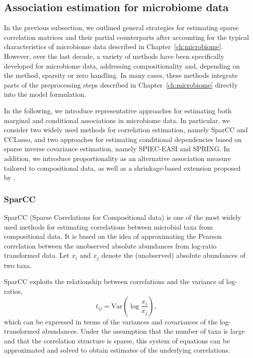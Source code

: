 \subsection{Association estimation for microbiome data}
\label{sec:5net:net_constr:asso_microbiome}

In the previous subsection, we outlined general strategies for estimating sparse correlation matrices and their partial counterparts after accounting for the typical characteristics of microbiome data described in Chapter~\ref{ch:microbiome}. However, over the last decade, a variety of methods have been specifically developed for microbiome data, addressing compositionality and, depending on the method, sparsity or zero handling. In many cases, these methods integrate parts of the preprocessing steps described in Chapter~\ref{ch:microbiome} directly into the model formulation.

In the following, we introduce representative approaches for estimating both marginal and conditional associations in microbiome data. In particular, we consider two widely used methods for correlation estimation, namely SparCC and CCLasso, and two approaches for estimating conditional dependencies based on sparse inverse covariance estimation, namely SPIEC-EASI and SPRING. In addition, we introduce proportionality as an alternative association measure tailored to compositional data, as well as a shrinkage-based extension proposed by \citet{badri2020shrinkage}.

\subsubsection{SparCC}
\label{sec:5net:net_constr:sparcc}

SparCC (Sparse Correlations for Compositional data) \citep{friedman2012inferring} is one of the most widely used methods for estimating correlations between microbial taxa from compositional data. It is based on the idea of approximating the Pearson correlation between the unobserved absolute abundances from log-ratio transformed data. Let $x_i$ and $x_j$ denote the (unobserved) absolute abundances of two taxa. 

SparCC exploits the relationship between correlations and the variance of log-ratios,
\begin{equation}
t_{ij} = \mathrm{Var}\left(\log\frac{x_i}{x_j}\right),
\end{equation}
which can be expressed in terms of the variances and covariances of the log-transformed abundances. Under the assumption that the number of taxa is large and that the correlation structure is sparse, this system of equations can be approximated and solved to obtain estimates of the underlying correlations.

